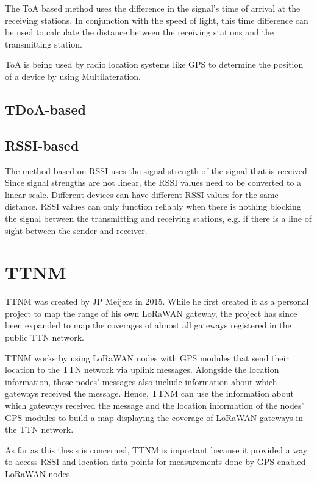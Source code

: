 The \acf{ToA} based method uses the difference in the signal's time of arrival at the receiving stations.
In conjunction with the speed of light, this time difference can be used to calculate the distance between the receiving stations and the transmitting station.

\ac{ToA} is being used by radio location systems like \ac{GPS} to determine the position of a device by using Multilateration.

\subsection{\acs{TDoA}-based}


\subsection{\acs{RSSI}-based}

The method based on \acf{RSSI} uses the signal strength of the signal that is received.
Since signal strengths are not linear, the \ac{RSSI} values need to be converted to a linear scale.
Different devices can have different \ac{RSSI} values for the same distance.
\ac{RSSI} values can only function reliably when there is nothing blocking the signal between the transmitting and receiving stations, e.g. if there is a line of sight between the sender and receiver.

\section{\acf{TTNM}}


\acf{TTNM} was created by JP Meijers in 2015. %
While he first created it as a personal project to map the range of his own \ac{LoRaWAN} gateway, the project has since been expanded to map the coverages of almost all gateways registered in the public \ac{TTN} network.


\acl{TTNM} works by using \ac{LoRaWAN} nodes with \ac{GPS} modules that send their location to the \ac{TTN} network via uplink messages.
Alongside the location information, those nodes' messages also include information about which gateways received the message.
Hence, \acl{TTNM} can use the information about which gateways received the message and the location information of the nodes' \ac{GPS} modules to build a map displaying the coverage of \ac{LoRaWAN} gateways in the \ac{TTN} network.


As far as this thesis is concerned, \acl{TTNM} is important because it provided a way to access \ac{RSSI} and location data points for measurements done by \ac{GPS}-enabled \ac{LoRaWAN} nodes.